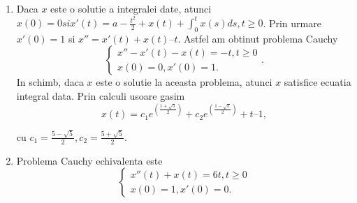 \documentclass[a4paper,12pt,oneside]{report}
\begin{document}
\begin{enumerate}
		      	\begin{enumerate}[label=(\alph*)]
		      		\item Daca \(x\) este o solutie a integralei date, atunci \(x\left ( 0 \right ) = 0 si {x}'\left ( t \right ) = a - \frac{t^{2}}{2} + x\left ( t \right ) + \int_{0}^{t}x\left ( s \right )ds, t\geq 0\). 
		      		      Prin urmare \({x}'\left ( 0 \right ) = 1\) si 
		      		      \({x}'' = {x}' \left (t  \right ) + x\left ( t \right ) – t\). 
		      		      Astfel am obtinut problema Cauchy 
		      		      \begin{displaymath}
		      		      	\left\{\begin{matrix}
		      		      	{x}'' - {x}'\left ( t \right ) - x\left ( t \right ) = -t, t\geq 0\\ 
		      		      	x\left ( 0 \right ) = 0, {x}'\left ( 0 \right ) = 1. 
		      		      	\end{matrix}\right.. 
		      		      \end{displaymath}
		      		      In schimb, daca \(x\) este o solutie la aceasta problema, atunci \(x\) satisfice ecuatia integral data.
		      		      Prin calculi usoare gasim 
		      		      \begin{displaymath}
		      		      	x\left ( t \right ) = c_{1}e^{\left (\frac{ 1 + \sqrt{5}}{2} \right )}+ c_{2}e^{\left ( \frac{1-\sqrt{5}}{2} \right )} + t – 1, 
		      		      \end{displaymath}
		      		      		      		      		      		      		      		      		      		      
		      		      cu 
		      		      \(c_{1} = \frac{5 - \sqrt{5}}{2}, c_{2} = \frac{5 + \sqrt{5}}{2}\). 
		      		      		      		      		      		      		      		      		      		      
		      		      		      		      		      		      		      		      		      		      
		      		\item Problema Cauchy echivalenta este 
		      		      \begin{displaymath} 
		      		      	\left\{\begin{matrix}
		      		      	{x}''\left ( t \right ) + x\left ( t \right ) = 6t, t\geq 0\\ 
		      		      	x\left ( 0 \right ) = 1, {x}'\left ( 0 \right ) = 0. 
		      		      	\end{matrix}\right.
		      		      \end{displaymath}
		      		      		      		      		      		      		      		      		      		      

\end{enumerate}
\end{enumerate}
\end{document}
